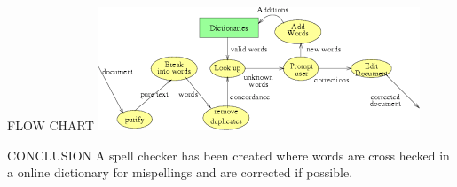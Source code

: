 \documentclass{beamer}
\begin{document}
\begin{frame}{FLOW CHART}
\includegraphics[scale=0.5]{index.png}     
\end{frame}



\begin{frame}{CONCLUSION}
A spell checker has been created where words are cross hecked in a online dictionary for mispellings and are corrected if possible.

\end{frame}
\end{document}
